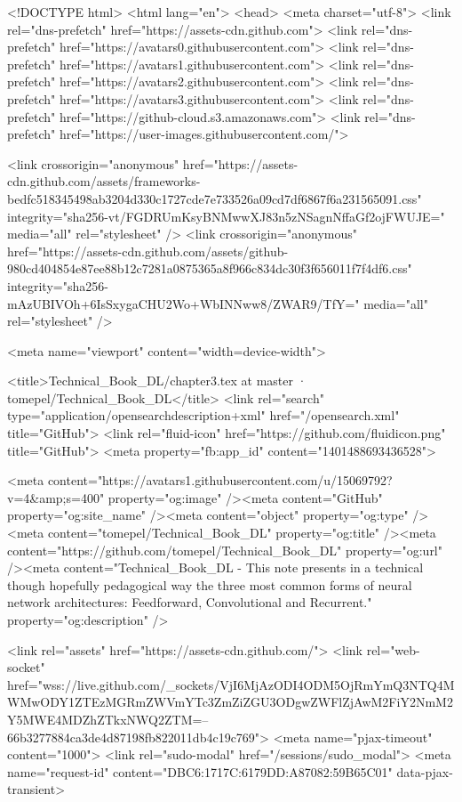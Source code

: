 





<!DOCTYPE html>
<html lang="en">
  <head>
    <meta charset="utf-8">
  <link rel="dns-prefetch" href="https://assets-cdn.github.com">
  <link rel="dns-prefetch" href="https://avatars0.githubusercontent.com">
  <link rel="dns-prefetch" href="https://avatars1.githubusercontent.com">
  <link rel="dns-prefetch" href="https://avatars2.githubusercontent.com">
  <link rel="dns-prefetch" href="https://avatars3.githubusercontent.com">
  <link rel="dns-prefetch" href="https://github-cloud.s3.amazonaws.com">
  <link rel="dns-prefetch" href="https://user-images.githubusercontent.com/">



  <link crossorigin="anonymous" href="https://assets-cdn.github.com/assets/frameworks-bedfc518345498ab3204d330c1727cde7e733526a09cd7df6867f6a231565091.css" integrity="sha256-vt/FGDRUmKsyBNMwwXJ83n5zNSagnNffaGf2ojFWUJE=" media="all" rel="stylesheet" />
  <link crossorigin="anonymous" href="https://assets-cdn.github.com/assets/github-980cd404854e87ee88b12c7281a0875365a8f966c834dc30f3f656011f7f4df6.css" integrity="sha256-mAzUBIVOh+6IsSxygaCHU2Wo+WbINNww8/ZWAR9/TfY=" media="all" rel="stylesheet" />
  
  
  
  

  <meta name="viewport" content="width=device-width">
  
  <title>Technical_Book_DL/chapter3.tex at master · tomepel/Technical_Book_DL</title>
  <link rel="search" type="application/opensearchdescription+xml" href="/opensearch.xml" title="GitHub">
  <link rel="fluid-icon" href="https://github.com/fluidicon.png" title="GitHub">
  <meta property="fb:app_id" content="1401488693436528">

    
    <meta content="https://avatars1.githubusercontent.com/u/15069792?v=4&amp;s=400" property="og:image" /><meta content="GitHub" property="og:site_name" /><meta content="object" property="og:type" /><meta content="tomepel/Technical_Book_DL" property="og:title" /><meta content="https://github.com/tomepel/Technical_Book_DL" property="og:url" /><meta content="Technical_Book_DL - This note presents in a technical though hopefully pedagogical way the three most common forms of neural network architectures: Feedforward, Convolutional and Recurrent." property="og:description" />

  <link rel="assets" href="https://assets-cdn.github.com/">
  <link rel="web-socket" href="wss://live.github.com/_sockets/VjI6MjAzODI4ODM5OjRmYmQ3NTQ4MWMwODY1ZTEzMGRmZWVmYTc3ZmZiZGU3ODgwZWFlZjAwM2FiY2NmM2Y5MWE4MDZhZTkxNWQ2ZTM=--66b3277884ca3de4d87198fb822011db4c19c769">
  <meta name="pjax-timeout" content="1000">
  <link rel="sudo-modal" href="/sessions/sudo_modal">
  <meta name="request-id" content="DBC6:1717C:6179DD:A87082:59B65C01" data-pjax-transient>
  

